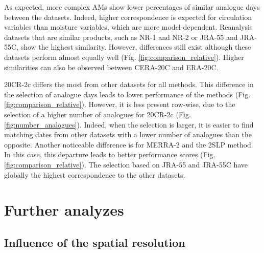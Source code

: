 \documentclass{ametsoc}
\begin{document}
As expected, more complex AMs show lower percentages of similar analogue days between the datasets. Indeed, higher correspondence is expected for circulation variables than moisture variables, which are more model-dependent. Reanalysis datasets that are similar products, such as NR-1 and NR-2 or JRA-55 and JRA-55C, show the highest similarity. However, differences still exist although these datasets perform almost equally well (Fig. \ref{fig:comparison_relative}). Higher similarities can also be observed between CERA-20C and ERA-20C.

20CR-2c differs the most from other datasets for all methods. This difference in the selection of analogue days leads to lower performance of the methods (Fig. \ref{fig:comparison_relative}). However, it is less present row-wise, due to the selection of a higher number of analogues for 20CR-2c (Fig. \ref{fig:number_analogues}). Indeed, when the selection is larger, it is easier to find matching dates from other datasets with a lower number of analogues than the opposite. Another noticeable difference is for MERRA-2 and the 2SLP method. In this case, this departure leads to better performance scores (Fig. \ref{fig:comparison_relative}). The selection based on JRA-55 and JRA-55C have globally the highest correspondence to the other datasets.


\section{Further analyzes}
\label{sec:analyzes}

\subsection{Influence of the spatial resolution}
\label{sec:resolution}
\end{document}
